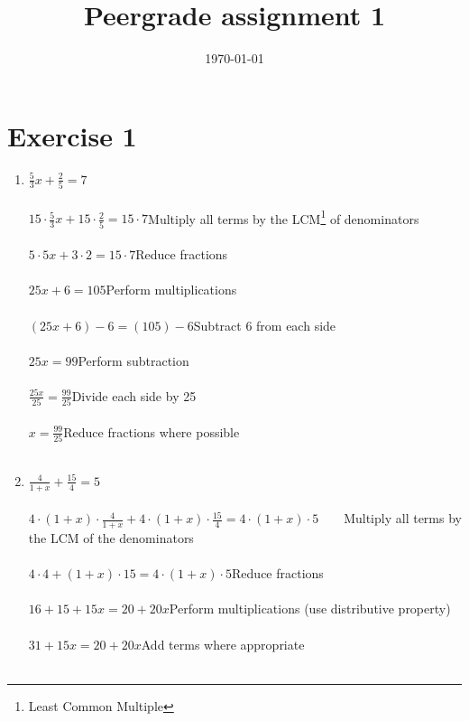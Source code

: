 \documentclass[a4paper,11pt]{article}
\title{Peergrade assignment 1}
\author{}
\date{\today}
\begin{document}
\maketitle

\section*{Exercise 1}
\begin{enumerate}
    \item 
         $\frac{5}{3}x + \frac{2}{5} = 7$ \\\\
         $15 \cdot \frac{5}{3}x + 15 \cdot \frac{2}{5} = 15 \cdot 7$\hfill Multiply all terms by the LCM\footnote{Least Common Multiple} of denominators\\\\
         $5 \cdot 5x + 3 \cdot 2 = 15 \cdot 7$\hfill Reduce fractions\\\\
         $25x + 6 = 105$\hfill Perform multiplications\\\\
         $(25x + 6) - 6 = (105) - 6$\hfill Subtract 6 from each side\\\\
         $25x = 99$\hfill Perform subtraction\\\\
         $\frac{25x}{25} = \frac{99}{25}$\hfill Divide each side by 25\\\\
         $x = \frac{99}{25}$\hfill Reduce fractions where possible\\\\
    \item 
         $\frac{4}{1+x} + \frac{15}{4} = 5$ \\\\
         $4 \cdot (1+x) \cdot \frac{4}{1+x} + 4 \cdot (1+x) \cdot \frac{15}{4} = 4 \cdot (1+x) \cdot 5$\hfill ~~~~Multiply all terms by the LCM of the denominators\\\\
         $4 \cdot 4 + (1+x) \cdot 15 = 4 \cdot (1+x) \cdot 5$\hfill Reduce fractions\\\\
         $16 + 15 + 15x = 20 + 20x$\hfill Perform multiplications (use distributive property)\\\\
         $31 + 15x = 20 + 20x$\hfill Add terms where appropriate\\\\

\end{enumerate}
\end{document}
